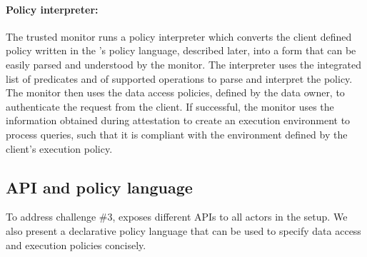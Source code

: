 \paragraph{Policy interpreter:} The trusted monitor runs a policy interpreter which converts the client defined policy written in the \project{}'s policy language, described later, into a form that can be easily parsed and understood by the monitor. The interpreter uses the integrated list of predicates and of supported operations to parse and interpret the policy. The monitor then uses the data access policies, defined by the data owner, to authenticate the request from the client. If successful, the monitor uses the information obtained during attestation to create an execution environment to process queries, such that it is compliant with the environment defined by the client's execution policy.


\subsection{\project{} API and policy language}
\label{sec:policylanguage}

To address challenge \#3, \project{} exposes different APIs to all actors in the setup. We also present a declarative policy language that can be used to specify data access and execution policies concisely.

